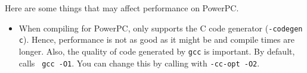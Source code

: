 
Here are some things that may affect performance on PowerPC.

\begin{itemize}

\item
When compiling for PowerPC, {\mlton} only supports the C code
generator ({\tt -codegen c}).  Hence, performance is not as good as it
might be and compile times are longer.  Also, the quality of code
generated by {\tt gcc} is important.  By default, {\mlton} calls {\tt
gcc -O1}.  You can change this by calling {\mlton} with {\tt -cc-opt
-O2}.

\end{itemize}
